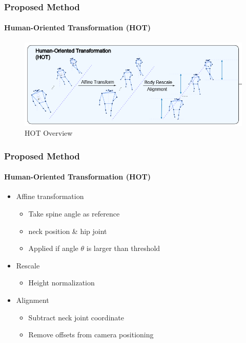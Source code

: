 \documentclass[
	12pt, %
	aspectratio=169, %
]{beamer}
\begin{document}
\begin{frame}
	\frametitle{Proposed Method}
	\framesubtitle{Human-Oriented Transformation (HOT)}

	\begin{figure}
		\centering
		\includegraphics[width=0.8\linewidth]{"./Images/hot.png"}
		\caption{HOT Overview}
	\end{figure}
\end{frame}

\begin{frame}
	\frametitle{Proposed Method}
	\framesubtitle{Human-Oriented Transformation (HOT)}

	\begin{itemize}
		\item Affine transformation
		\begin{itemize}
			\item Take spine angle as reference
			\item neck position \& hip joint
			\item Applied if angle $\theta$ is larger than threshold
		\end{itemize}
		\item Rescale
		\begin{itemize}
			\item Height normalization
		\end{itemize}
		\item Alignment
		\begin{itemize}
			\item Subtract neck joint coordinate
			\item Remove offsets from camera positioning
		\end{itemize}
	\end{itemize}
\end{frame}
\end{document}
